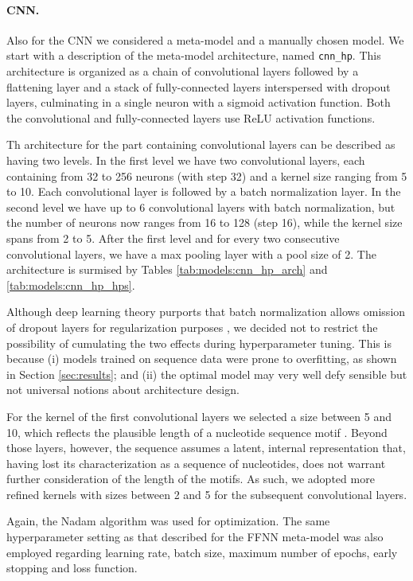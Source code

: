 \documentclass{article}
\begin{document}
\paragraph{CNN.} Also for the CNN we considered a meta-model and a manually chosen model. We start with a description of the meta-model architecture, named \texttt{cnn\_hp}. This architecture is organized as a chain of convolutional layers followed by a flattening layer and a stack of fully-connected layers interspersed with dropout layers, culminating in a single neuron with a sigmoid activation function. Both the convolutional and fully-connected layers use ReLU activation functions.

Th architecture for the part containing convolutional layers can be described as having two levels. In the first level we have two convolutional layers, each containing from 32 to 256 neurons (with step 32) and a kernel size ranging from 5 to 10. Each convolutional layer is followed by a batch normalization layer. In the second level we have up to 6 convolutional layers with batch normalization, but the number of neurons now ranges from 16 to 128 (step 16), while the kernel size spans from 2 to 5. After the first level and for every two consecutive convolutional layers, we have a max pooling layer with a pool size of 2. The architecture is surmised by Tables \ref{tab:models:cnn_hp_arch} and \ref{tab:models:cnn_hp_hps}.

Although deep learning theory purports that batch normalization allows omission of dropout layers for regularization purposes \cite{goodfellow16}, we decided not to restrict the possibility of cumulating the two effects during hyperparameter tuning. This is because (i) models trained on sequence data were prone to overfitting, as shown in Section \ref{sec:results}; and (ii) the optimal model may very well defy sensible but not universal notions about architecture design.

For the kernel of the first convolutional layers we selected a size between 5 and 10, which reflects the plausible length of a nucleotide sequence motif \cite{cappelletti20}. Beyond those layers, however, the sequence assumes a latent, internal representation that, having lost its characterization as a sequence of nucleotides, does not warrant further consideration of the length of the motifs. As such, we adopted more refined kernels with sizes between 2 and 5 for the subsequent convolutional layers.

Again, the Nadam algorithm was used for optimization. The same hyperparameter setting as that described for the FFNN meta-model was also employed regarding learning rate, batch size, maximum number of epochs, early stopping and loss function.
\end{document}

